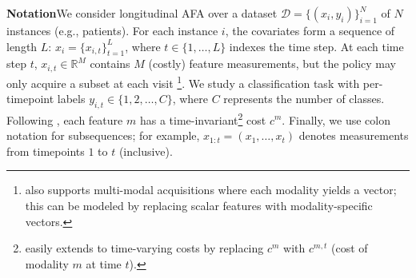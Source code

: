 \textbf{Notation}\quad We consider longitudinal AFA over a dataset $\mathcal{D} = \{(x_i, y_i)\}_{i=1}^N$ of $N$ instances (e.g., patients). For each instance $i$, the covariates form a sequence of length $L$: $x_i = \{x_{i,t}\}_{t=1}^L$, where $t \in \{1, \ldots, L\}$ indexes the time step. At each time step $t$, $x_{i,t} \in \mathbb{R}^M$ contains $M$ (costly) feature measurements, but the policy may only acquire a subset at each visit \footnote{\texttt{\OurMethod} also supports multi-modal acquisitions where each modality yields a vector; this can be modeled by replacing scalar features with modality-specific vectors.}. We study a classification task with per-timepoint labels $y_{i,t} \in \{1, 2, \ldots, C\}$, where $C$ represents the number of classes. Following \citet{qin2024risk, yoon2019asac}, each feature $m$ has a time-invariant\footnote{\texttt{\OurMethod} easily extends to time-varying costs by replacing $c^m$ with $c^{m, t}$ (cost of modality $m$ at time $t$).} cost $c^m$. Finally, we use colon notation for subsequences; for example, $x_{1:t} = (x_1, \ldots, x_t)$ denotes measurements from timepoints $1$ to $t$ (inclusive).


